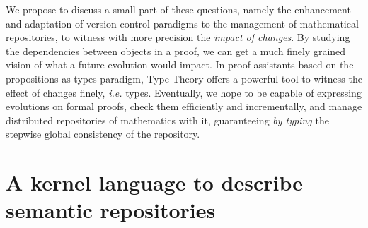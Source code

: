 \documentclass{article}
\newcommand{\remplan}[1]{}
\newcommand{\remtext}[1]{}
\begin{document}
\remtext{Fri Jun 18, 2010 9:55. AM Ici, on pourrait rajouter un
  paragraphe pour dire qu'il existe des travaux sur la formalisation
  de metatheories dans les assistants de preuve, que ce soit en TWELF
  ou Coq. Puis, on explicite notre but général qui est de construire
  un système/framework qui remplace la chaîne d'outils traditionnelle
  en important/adaptant la technologie issue de la formalisation de
  metatheories.}

\remplan{Sujet du papier : on focalise sur un problème bien précis}

\remtext{Fri Jun 18, 2010 10:00 AM.
  Un peu de liant. Pour arriver à notre but, il y a une
  question importante à résoudre: si on te donne une méta-théorie
  formalisée, es-tu capable de décrire l'historique d'un développement
  dans cette théorie? Cela induit deux questions : dans quel langage
  et est-ce que ce langage est utilisable (parce qu'a priori, ce n'est
  pas gagné car le développeur travaille en mode ``instantané'' et ne
  veut pas se trimballer ses casseroles tout le temps\ldots).}

We propose to discuss a small part of these questions, namely the
enhancement and adaptation of version control paradigms to the
management of mathematical repositories, to witness with more
precision the \emph{impact of changes}. By studying the dependencies
between objects in a proof, we can get a much finely grained vision of
what a future evolution would impact. In proof assistants based on the
propositions-as-types paradigm, Type Theory offers a powerful tool to
witness the effect of changes finely, \emph{i.e.} types. Eventually,
we hope to be capable of expressing evolutions on formal proofs, check
them efficiently and incrementally, and manage distributed
repositories of mathematics with it, guaranteeing \emph{by typing} the
stepwise global consistency of the repository.

\remtext{Fri Jun 18, 2010 10:06 AM.  Le paragraphe précédent n'est pas
  assez précis je pense et en même temps en dit trop. À la place, je
  propose d'énoncer succintement les contributions de ce papier puis 
  le plan. Ce serait quelque chose comme:
  1. A description language for semantic repositories.
  2. Theory development through semantic patches. 
  3. Related work
  4. Further work
}

\remplan{Fri Jun 18, 2010 10:08 AM. Du coup, je restructure un peu la suite.}

\section{A kernel language to describe semantic repositories}
\end{document}
